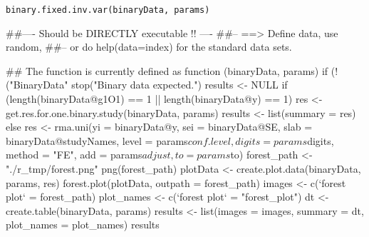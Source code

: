 \begin{Usage}
\begin{verbatim}
binary.fixed.inv.var(binaryData, params)
\end{verbatim}
\end{Usage}
\begin{Arguments}
\begin{ldescription}
\item[\code{binaryData}] 
\item[\code{params}] 
\end{ldescription}
\end{Arguments}
\begin{Examples}
\begin{ExampleCode}
##---- Should be DIRECTLY executable !! ----
##-- ==>  Define data, use random,
##--    or do  help(data=index)  for the standard data sets.

## The function is currently defined as
function (binaryData, params) 
{
    if (!("BinaryData" %
        stop("Binary data expected.")
    results <- NULL
    if (length(binaryData@g1O1) == 1 || length(binaryData@y) == 
        1) {
        res <- get.res.for.one.binary.study(binaryData, params)
        results <- list(summary = res)
    }
    else {
        res <- rma.uni(yi = binaryData@y, sei = binaryData@SE, 
            slab = binaryData@studyNames, level = params$conf.level, 
            digits = params$digits, method = "FE", add = params$adjust, 
            to = params$to)
        forest_path <- "./r_tmp/forest.png"
        png(forest_path)
        plotData <- create.plot.data(binaryData, params, res)
        forest.plot(plotData, outpath = forest_path)
        images <- c(`forest plot` = forest_path)
        plot_names <- c(`forest plot` = "forest_plot")
        dt <- create.table(binaryData, params)
        results <- list(images = images, summary = dt, plot_names = plot_names)
    }
    results
  }
\end{ExampleCode}
\end{Examples}

